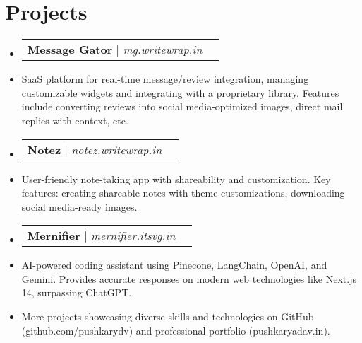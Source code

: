 \documentclass[letterpaper,11pt]{article}
\makeatletter
\newcommand{\resumeItem}[1]{
  \item\small{
    {#1 \vspace{-2pt}}
  }
}
\newcommand{\resumeProjectHeading}[2]{
    \vspace{-2pt}\item
    \begin{tabular*}{0.97\textwidth}{l@{\extracolsep{\fill}}r}
      \small#1 & #2 \\
    \end{tabular*}\vspace{-7pt}
}
\newcommand{\resumeSubHeadingListStart}{\begin{itemize}[leftmargin=0.15in, label={}]}
\newcommand{\resumeSubHeadingListEnd}{\end{itemize}}
\makeatother
\begin{document}
\section{Projects}
\resumeSubHeadingListStart

\resumeProjectHeading{\textbf{Message Gator} | \emph{mg.writewrap.in}}{}
\resumeItem{SaaS platform for real-time message/review integration, managing customizable widgets and integrating with a proprietary library. Features include converting reviews into social media-optimized images, direct mail replies with context, etc.}

\resumeProjectHeading{\textbf{Notez} | \emph{notez.writewrap.in}}{}
\resumeItem{User-friendly note-taking app with shareability and customization. Key features: creating shareable notes with theme customizations, downloading social media-ready images.}

\resumeProjectHeading{\textbf{Mernifier} | \emph{mernifier.itsvg.in}}{}
\resumeItem{AI-powered coding assistant using Pinecone, LangChain, OpenAI, and Gemini. Provides accurate responses on modern web technologies like Next.js 14, surpassing ChatGPT.}

\resumeItem{More projects showcasing diverse skills and technologies on GitHub (github.com/pushkarydv) and professional portfolio (pushkaryadav.in).}


\resumeSubHeadingListEnd

\end{document}
